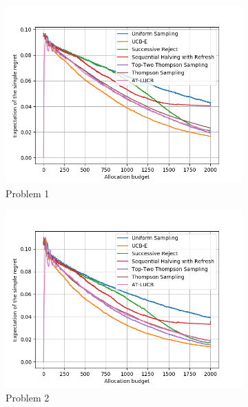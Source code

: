 \begin{figure}[ht]
  \centering
  \begin{subfigure}[t]{0.25\textwidth}
    \centering\includegraphics[width=\textwidth]{Chapter6/img/bai/setting1.png}
    \caption{Problem 1}
  \end{subfigure}%
  \begin{subfigure}[t]{0.25\textwidth}
    \centering\includegraphics[width=\textwidth]{Chapter6/img/bai/setting2.png}
    \caption{Problem 2}
  \end{subfigure}
  \begin{subfigure}[t]{0.25\textwidth}

\end{subfigure}
\end{figure}
